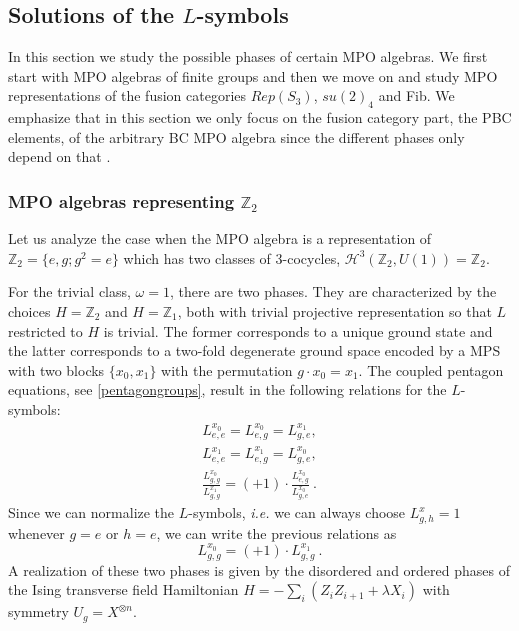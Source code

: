 \documentclass[a4paper,twocolumn,11pt,accepted=2023-02-10]{quantumarticle}
\begin{document}
\subsection{Solutions of the ${L}$-symbols}
%
In this section we study the possible phases of certain MPO algebras. We first start with MPO algebras of finite groups and then we move on and study MPO representations of the fusion categories $Rep(S_3)$, $su(2)_4$ and Fib. We emphasize that in this section we only focus on the fusion category part, the PBC elements, of the arbitrary BC MPO algebra since the different phases only depend on that \cite{etingof2003finite}. 


\subsubsection{MPO algebras representing $\mathbb{Z}_2$}

Let us analyze the case when the MPO algebra is a representation of $ \mathbb{Z}_2=\{e,g; g^2=e\}$ which has two classes of 3-cocycles, $\mathcal{H}^3(\mathbb{Z}_2,U(1))=\mathbb{Z}_2$.

For the trivial class, $\omega = 1$, there are two phases. They are characterized by the choices $H=\mathbb{Z}_2$ and $H=\mathbb{Z}_1$, both with trivial projective representation so that ${L}$ restricted to $H$ is trivial. The former corresponds to a unique ground state and the latter corresponds to a two-fold degenerate ground space encoded by a MPS with two blocks $\{x_0,x_1\}$ with the permutation $g{\cdot} x_0= x_1$. The coupled pentagon equations, see \eqref{pentagongroups}, result in the following relations for the ${L}$-symbols:
\begin{align*}
 {L}_{e,e}^{x_0} = {L}_{e,g}^{x_0} = {L}_{g,e}^{x_1}, \\  
  {L}_{e,e}^{x_1} = {L}_{e,g}^{x_1} = {L}_{g,e}^{x_0},  \\ 
  \frac{{L}_{g,g}^{x_0}}{{L}_{g,g}^{x_1}} = (+1)\cdot \frac{{L}_{e,g}^{x_0}}{{L}_{g,e}^{x_0}} \ .
\end{align*}
Since we can normalize the $L$-symbols, {\it i.e.} we can always choose ${L}_{g,h}^x=1$ whenever $g=e$ or $h=e$, we can write the previous relations as 
$${L}_{g,g}^{x_0}= (+1) \cdot {L}_{g,g}^{x_1}\ .$$
A realization of these two phases is given by the disordered and ordered phases of the Ising transverse field Hamiltonian $H=-\sum_i (Z_i Z_{i+1}+\lambda X_i)$ with symmetry $U_g=X^{\otimes n}$.
\end{document}

